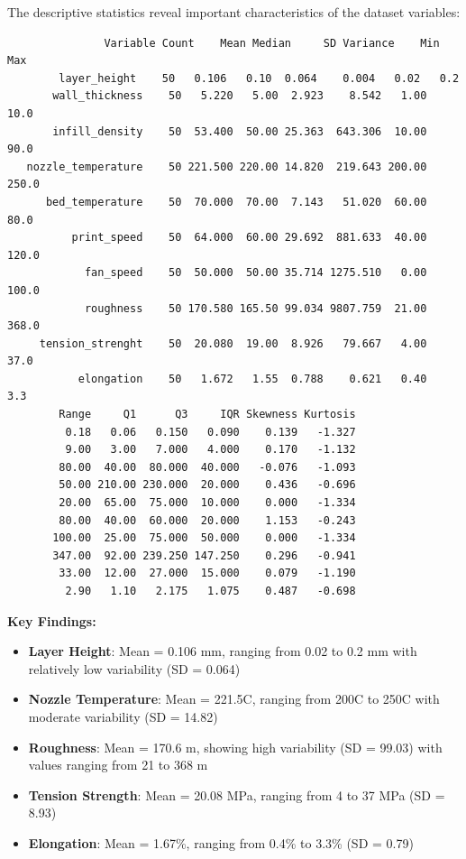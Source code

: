 The descriptive statistics reveal important characteristics of the dataset variables:

\begin{verbatim}
               Variable Count    Mean Median     SD Variance    Min   Max
        layer_height    50   0.106   0.10  0.064    0.004   0.02   0.2
       wall_thickness    50   5.220   5.00  2.923    8.542   1.00  10.0
       infill_density    50  53.400  50.00 25.363  643.306  10.00  90.0
   nozzle_temperature    50 221.500 220.00 14.820  219.643 200.00 250.0
      bed_temperature    50  70.000  70.00  7.143   51.020  60.00  80.0
          print_speed    50  64.000  60.00 29.692  881.633  40.00 120.0
            fan_speed    50  50.000  50.00 35.714 1275.510   0.00 100.0
            roughness    50 170.580 165.50 99.034 9807.759  21.00 368.0
     tension_strenght    50  20.080  19.00  8.926   79.667   4.00  37.0
           elongation    50   1.672   1.55  0.788    0.621   0.40   3.3
        Range     Q1      Q3     IQR Skewness Kurtosis
         0.18   0.06   0.150   0.090    0.139   -1.327
         9.00   3.00   7.000   4.000    0.170   -1.132
        80.00  40.00  80.000  40.000   -0.076   -1.093
        50.00 210.00 230.000  20.000    0.436   -0.696
        20.00  65.00  75.000  10.000    0.000   -1.334
        80.00  40.00  60.000  20.000    1.153   -0.243
       100.00  25.00  75.000  50.000    0.000   -1.334
       347.00  92.00 239.250 147.250    0.296   -0.941
        33.00  12.00  27.000  15.000    0.079   -1.190
         2.90   1.10   2.175   1.075    0.487   -0.698
\end{verbatim}

\textbf{Key Findings:}
\begin{itemize}
    \item \textbf{Layer Height}: Mean = 0.106 mm, ranging from 0.02 to 0.2 mm with relatively low variability (SD = 0.064)
    \item \textbf{Nozzle Temperature}: Mean = 221.5\textdegree C, ranging from 200\textdegree C to 250\textdegree C with moderate variability (SD = 14.82)
    \item \textbf{Roughness}: Mean = 170.6 \textmu m, showing high variability (SD = 99.03) with values ranging from 21 to 368 \textmu m
    \item \textbf{Tension Strength}: Mean = 20.08 MPa, ranging from 4 to 37 MPa (SD = 8.93)
    \item \textbf{Elongation}: Mean = 1.67\%, ranging from 0.4\% to 3.3\% (SD = 0.79)
\end{itemize}

